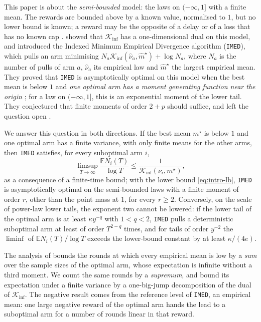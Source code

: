\documentclass[11pt]{article}
\newcommand{\E}{\mathbb{E}}
\begin{document}
This paper is about the \emph{semi-bounded} model: the laws on $(-\infty,1]$ with a finite mean.
The rewards are bounded above by a known value, normalised to $1$, but no lower bound is known; a
reward may be the opposite of a delay or of a loss that has no known cap
\citep[Section~1.2]{HT15}. \citet{HT15} showed that $\mathcal K_{\inf}$ has a one-dimensional dual on
this model, and introduced the Indexed Minimum Empirical Divergence algorithm (\texttt{IMED}), which
pulls an arm minimising $N_a\mathcal K_{\inf}(\hat\nu_a,\hat m^\star)+\log N_a$, where $N_a$ is the
number of pulls of arm $a$, $\hat\nu_a$ its empirical law and $\hat m^\star$ the largest empirical
mean. They proved that \texttt{IMED} is asymptotically optimal on this model when the best mean is
below $1$ and \emph{one optimal arm has a moment generating function near the origin}
\citep[Theorem~3 and Corollary~4]{HT15}; for a law on $(-\infty,1]$, this is an exponential moment
of the lower tail. They conjectured that finite moments of order $2+p$ should suffice, and left the
question open \citep[Section~9]{HT15}.

We answer this question in both directions. If the best mean $m^\star$ is below $1$ and one optimal
arm has a finite variance, with only finite means for the other arms, then \texttt{IMED} satisfies,
for every suboptimal arm $i$,
\begin{equation}\label{eq:intro-main}
  \limsup_{T\to\infty}\frac{\E N_i(T)}{\log T}\le\frac{1}{\mathcal K_{\inf}(\nu_i,m^\star)},
\end{equation}
as a consequence of a finite-time bound; with the lower bound \eqref{eq:intro-lb}, \texttt{IMED} is
asymptotically optimal on the semi-bounded laws with a finite moment of order $r$, other than the
point mass at $1$, for every $r\ge2$. Conversely, on the scale of power-law lower tails, the
exponent two cannot be lowered: if the lower tail of the optimal arm is at least $\kappa y^{-q}$ with
$1<q<2$, \texttt{IMED} pulls a deterministic suboptimal arm at least of order $T^{2-q}$ times, and for
tails of order $y^{-2}$ the $\liminf$ of $\E N_i(T)/\log T$ exceeds the lower-bound constant by at least
$\kappa/(4e)$.

The analysis of \citet{HT15} bounds the rounds at which every empirical mean is low by a \emph{sum}
over the sample sizes of the optimal arm, whose expectation is infinite without a third moment. We
count the same rounds by a \emph{supremum}, and bound its expectation under a finite variance by a
one-big-jump decomposition of the dual of $\mathcal K_{\inf}$. The negative result comes from the
reference level of \texttt{IMED}, an empirical mean: one large negative reward of the optimal arm
hands the lead to a suboptimal arm for a number of rounds linear in that reward.
\end{document}
